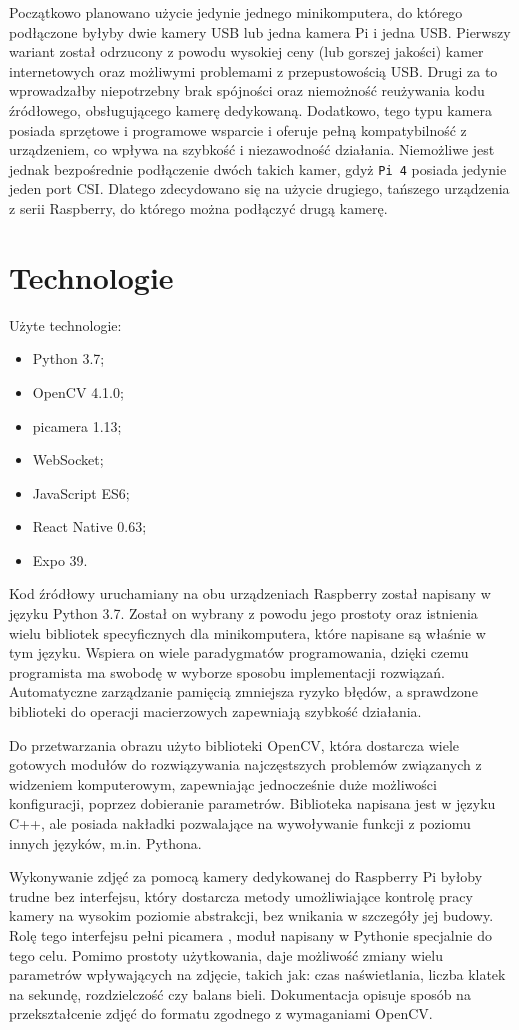 Początkowo planowano użycie jedynie jednego minikomputera, do którego podłączone byłyby dwie kamery USB lub jedna kamera Pi i jedna USB. Pierwszy wariant został odrzucony z powodu wysokiej ceny (lub gorszej jakości) kamer internetowych oraz możliwymi problemami z przepustowością USB. Drugi za to wprowadzałby niepotrzebny brak spójności oraz niemożność reużywania kodu źródłowego, obsługującego kamerę dedykowaną. Dodatkowo, tego typu kamera posiada sprzętowe i programowe wsparcie i oferuje pełną kompatybilność z urządzeniem, co wpływa na szybkość i niezawodność działania. Niemożliwe jest jednak bezpośrednie podłączenie dwóch takich kamer, gdyż \verb|Pi 4| posiada jedynie jeden port CSI. Dlatego zdecydowano się na użycie drugiego, tańszego urządzenia z serii Raspberry, do którego można podłączyć drugą kamerę. 
\clearpage
\section{Technologie}
Użyte technologie:
\begin{itemize}
  \item Python 3.7;
  \item OpenCV 4.1.0;
  \item picamera 1.13;
  \item WebSocket;
  \item JavaScript ES6;
  \item React Native 0.63;
  \item Expo 39.
\end{itemize}

Kod źródłowy uruchamiany na obu urządzeniach Raspberry został napisany w języku Python 3.7. Został on wybrany z powodu jego prostoty oraz istnienia wielu bibliotek specyficznych dla minikomputera, które napisane są właśnie w tym języku. Wspiera on wiele paradygmatów programowania, dzięki czemu programista ma swobodę w wyborze sposobu implementacji rozwiązań. Automatyczne zarządzanie pamięcią zmniejsza ryzyko błędów, a sprawdzone biblioteki do operacji macierzowych zapewniają szybkość działania.

Do przetwarzania obrazu użyto biblioteki OpenCV, która dostarcza wiele gotowych modułów do rozwiązywania najczęstszych problemów związanych z widzeniem komputerowym, zapewniając jednocześnie duże możliwości konfiguracji, poprzez dobieranie parametrów. Biblioteka napisana jest w języku C++, ale posiada nakładki pozwalające na wywoływanie funkcji z poziomu innych języków, m.in. Pythona.

Wykonywanie zdjęć za pomocą kamery dedykowanej do Raspberry Pi byłoby trudne bez interfejsu, który dostarcza metody umożliwiające kontrolę pracy kamery na wysokim poziomie abstrakcji, bez wnikania w szczegóły jej budowy. Rolę tego interfejsu pełni picamera \cite{picamera}, moduł napisany w Pythonie specjalnie do tego celu. Pomimo prostoty użytkowania, daje możliwość zmiany wielu parametrów wpływających na zdjęcie, takich jak: czas naświetlania, liczba klatek na sekundę, rozdzielczość czy balans bieli. Dokumentacja opisuje sposób na przekształcenie zdjęć do formatu zgodnego z wymaganiami OpenCV.

